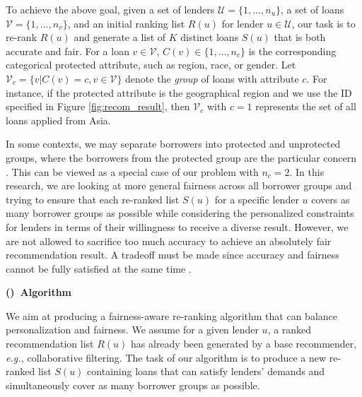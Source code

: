 
To achieve the above goal, given a set of lenders $\mathcal U=\{1,\ldots,n_u\}$, a set of loans $\mathcal V=\{1,\ldots,n_v\}$, and an initial ranking list $R(u)$ for lender $u\in \mathcal U$, our task is to re-rank $R(u)$ and generate a list of $K$ distinct loans $S(u)$ that is both accurate and fair. For a loan $v\in\mathcal V$, $C(v)\in\{1,\ldots,n_c\}$ is the corresponding categorical protected attribute, such as region, race, or gender. Let $\mathcal V_c=\{v|C(v)=c, v\in \mathcal V\}$ denote the \emph{group} of loans with attribute $c$. For instance, if the protected attribute is the geographical region and we use the ID specified in Figure \ref{fig:recom_result}, then $\mathcal V_c$ with $c=1$ represents the set of all loans applied from Asia.


In some contexts, we may separate borrowers into protected and unprotected groups, where the borrowers from the protected group are the particular concern \cite{zliobaite2015survey}. This can be viewed as a special case of our problem with $n_c=2$. In this research, we are looking at more general fairness across all borrower groups and trying to ensure that each re-ranked list $S(u)$ for a specific lender $u$ covers as many borrower groups as possible while considering the personalized constraints for lenders in terms of their willingness to receive a diverse result.
However, we are not allowed to sacrifice too much accuracy to achieve an absolutely fair recommendation result. A tradeoff must be made since accuracy and fairness cannot be fully satisfied at the same time \cite{burke_robin_multisided_nodate}.


\vspace{0.25cm}
\noindent \textbf{()~Algorithm}
\vspace{0.25cm}


We aim at producing a fairness-aware re-ranking algorithm that can balance personalization and fairness. We assume for a given lender $u$, a ranked recommendation list $R(u)$ has already been generated by a base recommender, \emph{e.g.,} collaborative filtering. The task of our algorithm is to produce a new re-ranked list $S(u)$ containing loans that can satisfy lenders' demands and simultaneously cover as many borrower groups as possible.

